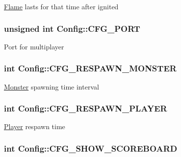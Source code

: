\hyperlink{class_flame}{Flame} lasts for that time after ignited \hypertarget{struct_config_a2ee7154f605e424def9f1289e328f331}{
\subsubsection[{C\-F\-G\-\_\-\-P\-O\-R\-T}]{\setlength{\rightskip}{0pt plus 5cm}unsigned int Config\-::\-C\-F\-G\-\_\-\-P\-O\-R\-T}}\label{struct_config_a2ee7154f605e424def9f1289e328f331}
Port for multiplayer \hypertarget{struct_config_a68f25bf53407aa4d78dbf20810084c21}{
\subsubsection[{C\-F\-G\-\_\-\-R\-E\-S\-P\-A\-W\-N\-\_\-\-M\-O\-N\-S\-T\-E\-R}]{\setlength{\rightskip}{0pt plus 5cm}int Config\-::\-C\-F\-G\-\_\-\-R\-E\-S\-P\-A\-W\-N\-\_\-\-M\-O\-N\-S\-T\-E\-R}}\label{struct_config_a68f25bf53407aa4d78dbf20810084c21}
\hyperlink{class_monster}{Monster} spawning time interval \hypertarget{struct_config_a4dca8b903aa44d2eeac1360b3bd8abe3}{
\subsubsection[{C\-F\-G\-\_\-\-R\-E\-S\-P\-A\-W\-N\-\_\-\-P\-L\-A\-Y\-E\-R}]{\setlength{\rightskip}{0pt plus 5cm}int Config\-::\-C\-F\-G\-\_\-\-R\-E\-S\-P\-A\-W\-N\-\_\-\-P\-L\-A\-Y\-E\-R}}\label{struct_config_a4dca8b903aa44d2eeac1360b3bd8abe3}
\hyperlink{class_player}{Player} respawn time \hypertarget{struct_config_a4d8faf4496d7fad5ce922354581e7c2b}{
\subsubsection[{C\-F\-G\-\_\-\-S\-H\-O\-W\-\_\-\-S\-C\-O\-R\-E\-B\-O\-A\-R\-D}]{\setlength{\rightskip}{0pt plus 5cm}int Config\-::\-C\-F\-G\-\_\-\-S\-H\-O\-W\-\_\-\-S\-C\-O\-R\-E\-B\-O\-A\-R\-D}}\label{struct_config_a4d8faf4496d7fad5ce922354581e7c2b}
